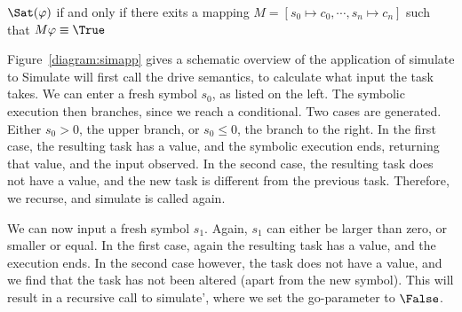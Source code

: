 \begin{figure*}
\caption{Application of the simulation function to Example~\ref{example:abs}}
\label{diagram:simapp}
\end{figure*}

\begin{definition}
  \label{def:Sat}
  $\Sat(\phi)$ if and only if there exits a mapping $M=[s_0\mapsto c_0,\cdots,s_n\mapsto c_n]$ such that $M\phi\equiv\True$
\end{definition}

Figure~\ref{diagram:simapp} gives a schematic overview of the application of simulate to
Simulate will first call the drive semantics, to calculate what input the task takes.
We can enter a fresh symbol $s_0$, as listed on the left.
The symbolic execution then branches, since we reach a conditional.
Two cases are generated. Either $s_0>0$, the upper branch, or $s_0\leq0$, the  branch to the right.
In the first case, the resulting task has a value, and the symbolic execution ends, returning that value, and the input observed.
In the second case, the resulting task does not have a value, and the new task is different from the previous task.
Therefore, we recurse, and simulate is called again.

We can now input a fresh symbol $s_1$. Again, $s_1$ can either be larger than zero, or smaller or equal.
In the first case, again the resulting task has a value, and the execution ends.
In the second case however, the task does not have a value, and we find that the task has not been altered (apart from the new symbol).
This will result in a recursive call to simulate', where we set the go-parameter to $\False$.

